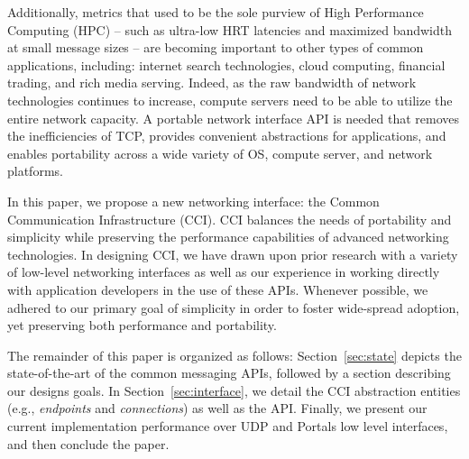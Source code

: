 Additionally, metrics that used to be the sole purview of High
Performance Computing (HPC) -- such as ultra-low HRT latencies and
maximized bandwidth at small message sizes -- are becoming important
to other types of common applications, including: internet search
technologies, cloud computing, financial trading, and rich media
serving.
%
Indeed, as the raw bandwidth of network technologies continues to
increase, compute servers need to be able to utilize the entire
network capacity.
%
A portable network interface API is needed that removes the
inefficiencies of TCP, provides convenient abstractions for
applications, and enables portability across a wide variety of OS,
compute server, and network platforms.

In this paper, we propose a new networking interface: the Common
Communication Infrastructure (CCI).  
%
CCI balances the needs of portability and simplicity while preserving
the performance capabilities of advanced networking technologies. 
%
In designing CCI, we have drawn upon prior research with a variety of
low-level networking interfaces as well as our experience in working
directly with application developers in the use of these APIs.
%
Whenever possible, we adhered to our primary goal of simplicity in
order to foster wide-spread adoption, yet preserving both performance
and portability.

The remainder of this paper is organized as follows:
%
Section~\ref{sec:state} depicts the state-of-the-art of the common
messaging APIs, followed by a section describing our designs goals.
%
In Section~\ref{sec:interface}, we detail the CCI abstraction entities
(e.g., {\em endpoints} and {\em connections}) as well as the API.
%
Finally, we present our current implementation performance over UDP
and Portals low level interfaces, and then conclude the paper.


